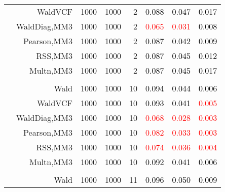 \documentclass[
]{article}
\begin{document}
\begin{table}[H]
{\begin{tabular}[t]{lrrrrrrr}
\hspace{1em} & WaldVCF & 1000 & 1000 & 2 & \textcolor{black}{0.088} & \textcolor{black}{0.047} & \textcolor{black}{0.017}\\

\hspace{1em} & WaldDiag,MM3 & 1000 & 1000 & 2 & \textcolor{red}{0.065} & \textcolor{red}{0.031} & \textcolor{black}{0.008}\\

\hspace{1em} & Pearson,MM3 & 1000 & 1000 & 2 & \textcolor{black}{0.087} & \textcolor{black}{0.042} & \textcolor{black}{0.009}\\

\hspace{1em} & RSS,MM3 & 1000 & 1000 & 2 & \textcolor{black}{0.087} & \textcolor{black}{0.045} & \textcolor{black}{0.012}\\

\hspace{1em} & Multn,MM3 & 1000 & 1000 & 2 & \textcolor{black}{0.087} & \textcolor{black}{0.045} & \textcolor{black}{0.017}\\
\cmidrule{1-8}
\addlinespace[0.3em]
\multicolumn{8}{l}{\textbf{1F 15V}}\\
\hspace{1em} & Wald & 1000 & 1000 & 10 & \textcolor{black}{0.094} & \textcolor{black}{0.044} & \textcolor{black}{0.006}\\

\hspace{1em} & WaldVCF & 1000 & 1000 & 10 & \textcolor{black}{0.093} & \textcolor{black}{0.041} & \textcolor{red}{0.005}\\

\hspace{1em} & WaldDiag,MM3 & 1000 & 1000 & 10 & \textcolor{red}{0.068} & \textcolor{red}{0.028} & \textcolor{red}{0.003}\\

\hspace{1em} & Pearson,MM3 & 1000 & 1000 & 10 & \textcolor{red}{0.082} & \textcolor{red}{0.033} & \textcolor{red}{0.003}\\

\hspace{1em} & RSS,MM3 & 1000 & 1000 & 10 & \textcolor{red}{0.074} & \textcolor{red}{0.036} & \textcolor{red}{0.004}\\

\hspace{1em} & Multn,MM3 & 1000 & 1000 & 10 & \textcolor{black}{0.092} & \textcolor{black}{0.041} & \textcolor{black}{0.006}\\
\cmidrule{1-8}
\addlinespace[0.3em]
\multicolumn{8}{l}{\textbf{2F 10V}}\\
\hspace{1em} & Wald & 1000 & 1000 & 11 & \textcolor{black}{0.096} & \textcolor{black}{0.050} & \textcolor{black}{0.009}\\


\end{tabular}}
\end{table}
\end{document}
